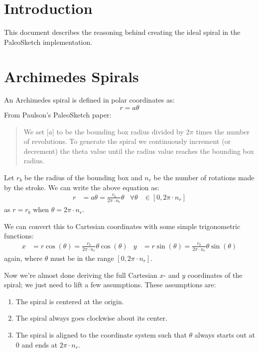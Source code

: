 \documentclass{article}
\begin{document}
\section{Introduction}

This document describes the reasoning behind creating the ideal spiral in the PaleoSketch implementation.

\section{Archimedes Spirals}

An Archimedes spiral is defined in polar coordinates as:
\[r = a\theta\]
From Paulson's PaleoSketch paper:
\begin{quote}
  We set [$a$] to be the bounding box radius divided by $2\pi$ times the number of revolutions. To generate the spiral we continuously increment (or decrement) the theta value until the radius value reaches the bounding box radius.
\end{quote}
Let $r_b$ be the radius of the bounding box and $n_r$ be the number of rotations made by the stroke.  We can write the above equation as:
\begin{align*}
  r &= a\theta = \frac{r_b}{2\pi \cdot n_r}\theta & \forall \theta&\in[0,2\pi\cdot n_r]
\end{align*}
as $r=r_b$ when $\theta=2\pi\cdot n_r$.

We can convert this to Cartesian coordinates with some simple trigonometric functions:
\begin{align*}
  x &= r                               \cos(\theta)
     = \frac{r_b}{2\pi \cdot n_r}\theta\cos(\theta) &
  y &= r                               \sin(\theta)
     = \frac{r_b}{2\pi \cdot n_r}\theta\sin(\theta)
\end{align*}
again, where $\theta$ must be in the range $[0,2\pi\cdot n_r]$.

Now we're almost done deriving the full Cartesian $x$- and $y$ coordinates of the spiral; we just need to lift a few assumptions.  These assumptions are:
\begin{enumerate}
  \item The spiral is centered at the origin.
  \item The spiral always goes clockwise about its center.
  \item The spiral is aligned to the coordinate system such that $\theta$ always starts out at 0 and ends at $2\pi\cdot n_r$.
\end{enumerate}
\end{document}

